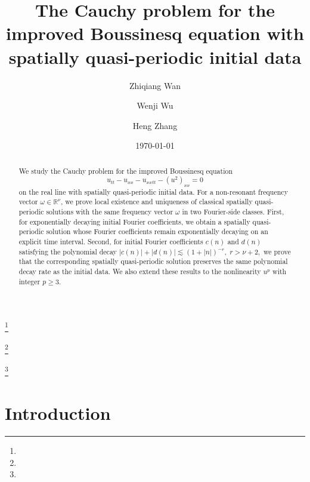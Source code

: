 \documentclass[12pt,reqno,tbtags]{amsart}
\newcommand\1{\mathbbm{1}}
\begin{document}
\title[The Cauchy problem for the improved Boussinesq equation with spatially quasi-periodic initial data]{The Cauchy problem for the improved Boussinesq equation with spatially quasi-periodic initial data}



\author{Zhiqiang Wan}
\thanks{}
\address{School of Mathematical Sciences, University of Science and Technology of China, No. 96 Jinzhai Road, Baohe District, Hefei, Anhui Province, China}

\author{Wenji Wu}
\thanks{}
\address{School of Mathematical Sciences, University of Science and Technology of China, No. 96 Jinzhai Road, Baohe District, Hefei, Anhui Province, China}

\author{Heng Zhang}
\thanks{}
\address{School of Mathematical Sciences, University of Science and Technology of China, No. 96 Jinzhai Road, Baohe District, Hefei, Anhui Province, China}


\date{\today}


\begin{abstract}
We study the Cauchy problem for the improved Boussinesq equation
\[
    u_{tt}-u_{xx}-u_{xxtt}-(u^2)_{xx}=0
\]
on the real line with spatially quasi-periodic initial data. For a non-resonant
frequency vector $\omega\in\mathbb R^\nu$, we prove local existence and uniqueness of classical spatially
quasi-periodic solutions with the same frequency vector $\omega$ in two
Fourier-side classes. First, for exponentially decaying initial Fourier
coefficients, we obtain a spatially quasi-periodic solution whose Fourier
coefficients remain exponentially decaying on an explicit time interval. Second,
for initial Fourier coefficients $c(n)$ and $d(n)$ satisfying the polynomial
decay
$
    |c(n)|+|d(n)|\lesssim (1+|n|)^{-r},
    \; r>\nu+2,
$
we prove that the corresponding spatially quasi-periodic solution preserves the
same polynomial decay rate as the initial data. We also extend these results to the nonlinearity $u^p$ with integer $p \geq 3$.
\end{abstract}




\maketitle



\section{Introduction}
\end{document}
